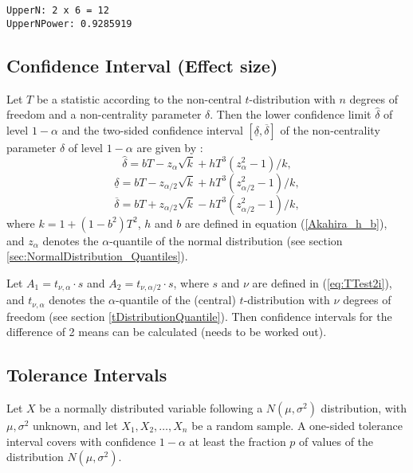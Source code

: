\begin{verbatim}
UpperN: 2 x 6 = 12
UpperNPower: 0.9285919
\end{verbatim}



\subsection{Confidence Interval (Effect size)}
Let $T$ be a statistic according to the non-central $t$-distribution
with $n$ degrees of freedom and a non-centrality parameter $\delta$. Then
the lower confidence limit $\widehat{\delta}$ of level $1-\alpha$ and the two-sided confidence interval $[ \underline{\delta},\overline{\delta}]$ of the
non-centrality parameter $\delta$ of level $1-\alpha$ are given by \cite{akahira_1995}:
\begin{equation}
	\widehat{\delta} = bT - z_\alpha \sqrt{k} +  h T^3 (z_\alpha^2 - 1)/k,
\end{equation} 
\begin{equation}
	\underline{\delta} = bT - z_{\alpha/2} \sqrt{k} +  h T^3 (z_{\alpha/2}^2 - 1)/k,
\end{equation} 
\begin{equation}
	\overline{\delta} = bT + z_{\alpha/2} \sqrt{k} -  h T^3 (z_{\alpha/2}^2 - 1)/k,
\end{equation} 
where $k=1+(1-b^2)T^2$, $h$ and $b$ are defined in equation (\ref{Akahira_h_b}), and $z_\alpha$ denotes the $\alpha$-quantile of the normal distribution (see section \ref{sec:NormalDistribution_Quantiles}).


Let $A_1=t_{\nu,\alpha} \cdot s$ and $A_2=t_{\nu,\alpha/2} \cdot s$, where $s$ and $\nu$ are defined in (\ref{eq:TTest2i}), and $t_{\nu,\alpha}$ denotes the $\alpha$-quantile of the (central) $t$-distribution with $\nu$ degrees of freedom (see section \ref{tDistributionQuantile}). Then confidence intervals for the difference of 2 means can be calculated (needs to be worked out).



\subsection{Tolerance Intervals}
Let $X$ be a normally distributed variable following a $N(\mu,\sigma^2)$ distribution, with $\mu, \sigma^2$ unknown, and let $X_1,X_2,\ldots,X_n$ be a random sample.
A one-sided tolerance interval covers with confidence $1-\alpha$ at least the fraction $p$ of values of the distribution $N(\mu,\sigma^2)$.

